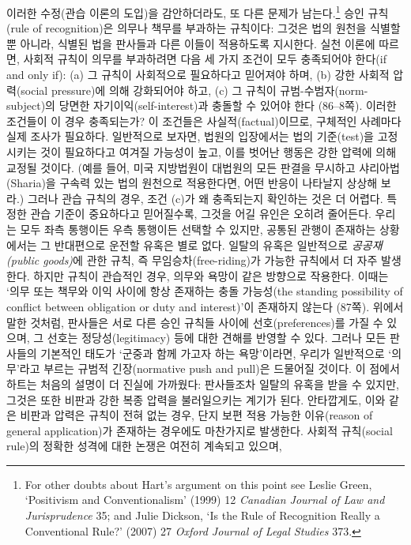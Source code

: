 \documentclass[12pt, oneside]{book}  %
\begin{document}
이러한 수정(관습 이론의 도입)을 감안하더라도, 또 다른 문제가
남는다.\footnote{For other doubts about Hart's argument on this point
  see Leslie Green, `Positivism and Conventionalism' (1999) 12
  \emph{Canadian Journal of Law and Jurisprudence} 35; and Julie
  Dickson, `Is the Rule of Recognition Really a Conventional Rule?'
  (2007) 27 \emph{Oxford Journal of Legal Studies} 373.} 승인 규칙(rule
of recognition)은 의무나 책무를 부과하는 규칙이다: 그것은 법의 원천을
식별할 뿐 아니라, 식별된 법을 판사들과 다른 이들이 적용하도록 지시한다.
실천 이론에 따르면, 사회적 규칙이 의무를 부과하려면 다음 세 가지 조건이
모두 충족되어야 한다(if and only if): (a) 그 규칙이 사회적으로 필요하다고 믿어져야 하며,
(b) 강한 사회적 압력(social pressure)에 의해 강화되어야 하고, (c) 그
규칙이 규범-수범자(norm-subject)의 당면한 자기이익(self-interest)과 충돌할
수 있어야 한다 (86--8쪽). 이러한 조건들이 이 경우 충족되는가? 이
조건들은 사실적(factual)이므로, 구체적인 사례마다 실제 조사가 필요하다.
일반적으로 보자면, 법원의 입장에서는 법의 기준(test)을 고정시키는 것이
필요하다고 여겨질 가능성이 높고, 이를 벗어난 행동은 강한 압력에 의해
교정될 것이다. (예를 들어, 미국 지방법원이 대법원의 모든 판결을 무시하고
샤리아법(Sharia)을 구속력 있는 법의 원천으로 적용한다면, 어떤 반응이
나타날지 상상해 보라.) 그러나 관습 규칙의 경우, 조건 (c)가 왜 충족되는지
확인하는 것은 더 어렵다. 특정한 관습 기준이 중요하다고 믿어질수록,
그것을 어길 유인은 오히려 줄어든다. 우리는 모두 좌측 통행이든 우측
통행이든 선택할 수 있지만, 공통된 관행이 존재하는 상황에서는 그
반대편으로 운전할 유혹은 별로 없다. 일탈의 유혹은 일반적으로
\emph{공공재(public goods)}에 관한 규칙, 즉 무임승차(free-riding)가
가능한 규칙에서 더 자주 발생한다. 하지만 규칙이 관습적인 경우, 의무와
욕망이 같은 방향으로 작용한다. 이때는 `의무 또는 책무와 이익 사이에 항상
존재하는 충돌 가능성(the standing possibility of conflict between
obligation or duty and interest)'이 존재하지 않는다 (87쪽). 위에서 말한
것처럼, 판사들은 서로 다른 승인 규칙들 사이에 선호(preferences)를 가질
수 있으며, 그 선호는 정당성(legitimacy) 등에 대한 견해를 반영할 수 있다.
그러나 모든 판사들의 기본적인 태도가 `군중과 함께 가고자 하는
욕망'이라면, 우리가 일반적으로 `의무'라고 부르는 규범적 긴장(normative
push and pull)은 드물어질 것이다. 이 점에서 하트는 처음의 설명이 더
진실에 가까웠다: 판사들조차 일탈의 유혹을 받을 수 있지만, 그것은 또한
비판과 강한 복종 압력을 불러일으키는 계기가 된다. 안타깝게도, 이와 같은
비판과 압력은 규칙이 전혀 없는 경우, 단지 보편 적용 가능한 이유(reason
of general application)가 존재하는 경우에도 마찬가지로 발생한다. 사회적
규칙(social rule)의 정확한 성격에 대한 논쟁은 여전히 계속되고 있으며,
\end{document}
